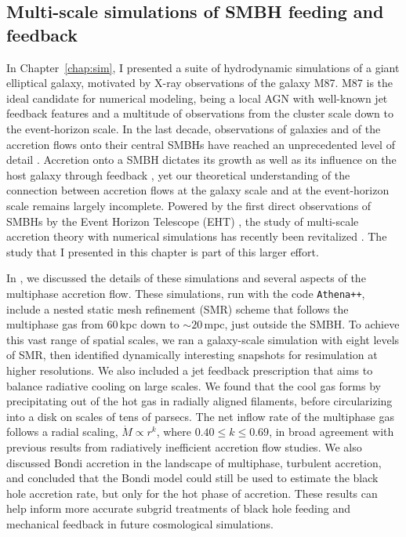 \subsection{Multi-scale simulations of SMBH feeding and feedback}

In Chapter~\ref{chap:sim}, I presented a suite of hydrodynamic simulations of a giant elliptical galaxy, motivated by X-ray observations of the galaxy M87\@.
M87 is the ideal candidate for numerical modeling, being a local AGN with well-known jet feedback features and a multitude of observations from the cluster scale down to the event-horizon scale.
In the last decade, observations of galaxies and of the accretion flows onto their central SMBHs have reached an unprecedented level of detail \citep[e.g.,][]{walsh_m87_2013,prieto_central_2016,boselli_virgo_2019,eht_one}.
Accretion onto a SMBH dictates its growth as well as its influence on the host galaxy through feedback \citep[][]{kormendy_coevolution_2013}, yet our theoretical understanding of the connection between accretion flows at the galaxy scale and at the event-horizon scale remains largely incomplete.
Powered by the first direct observations of SMBHs by the Event Horizon Telescope (EHT) \citep{eht_one, eht_sgt_one}, the study of multi-scale accretion theory with numerical simulations has recently been revitalized \citep{ressler_ab_2020,guo_toward_2023,hopkins_forged_2024,cho_multizone_2024}.
The study that I presented in this chapter is part of this larger effort.

In \citet{ha_galaxy-_2026}, we discussed the details of these simulations and several aspects of the multiphase accretion flow.
These simulations, run with the code \texttt{Athena++}, include a nested static mesh refinement (SMR) scheme that follows the multiphase gas from 60\,kpc down to $\sim 20\,$mpc, just outside the SMBH\@.
To achieve this vast range of spatial scales, we ran a galaxy-scale simulation with eight levels of SMR, then identified dynamically interesting snapshots for resimulation at higher resolutions.
We also included a jet feedback prescription that aims to balance radiative cooling on large scales.
We found that the cool gas forms by precipitating out of the hot gas in radially aligned filaments, before circularizing into a disk on scales of tens of parsecs.
The net inflow rate of the multiphase gas follows a radial scaling, $\dot{M}\propto r^k$, where $0.40 \leq k \leq 0.69$, in broad agreement with previous results from radiatively inefficient accretion flow studies.
We also discussed Bondi accretion in the landscape of multiphase, turbulent accretion, and concluded that the Bondi model could still be used to estimate the black hole accretion rate, but only for the hot phase of accretion.
These results can help inform more accurate subgrid treatments of black hole feeding and mechanical feedback in future cosmological simulations.

